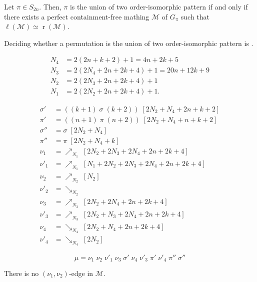 \documentclass[a4paper,10pt]{llncs}
\DeclareMathOperator{\LEFT}{\ell}
\DeclareMathOperator{\RIGHT}{r}
\begin{document}
\begin{proposition}
Let $\pi \in S_{2n}$.
Then,
$\pi$ is the union of two order-isomorphic pattern
if and only if
there exists a perfect containment-free mathing
$\mathcal{M}$ of $G_\pi$ such that
$\LEFT(\mathcal{M}) \simeq \RIGHT(\mathcal{M})$.
\end{proposition}

\begin{proposition}
Deciding whether a permutation is the union of two
order-isomorphic pattern is \NPC.
\end{proposition}


\begin{align*}
N_4 &= 2(2n + k + 2) + 1  = 4n + 2k + 5 \\
N_3 &= 2(2N_4 + 2n + 2k + 4) + 1 = 20n + 12k + 9 \\
N_2 &= 2(2N_3 + 2n + 2k + 4) + 1 \\
N_1 &= 2(2N_2 + 2n + 2k + 4) + 1\text{.}
\end{align*}

\begin{align*}
\sigma'  &= ((k+1) \; \sigma \; (k+2)) \; [2N_2 + N_4 + 2n + k + 2] \\
\pi'     &= ((n+1) \; \pi \; (n+2)) \; [2N_2 + N_4 + n + k + 2] \\
\sigma'' &= \sigma \; [2N_2 + N_4] \\
\pi''    &= \pi \; [2N_2 + N_4 + k] \\
\nu_1    &= \nearrow_{N_1} \; [2N_2 + 2N_3 + 2N_4 + 2n + 2k + 4] \\
\nu'_1   &= \nearrow_{N_1} \; [N_1 + 2N_2 + 2N_3 + 2N_4 + 2n + 2k + 4] \\
\nu_2    &= \nearrow_{N_2} \; [N_2] \\
\nu'_2   &= \searrow_{N_2} \\
\nu_3    &= \nearrow_{N_3} \; [2N_2 + 2N_4 + 2n + 2k + 4] \\
\nu'_3   &= \nearrow_{N_3} \; [2N_2 + N_3 + 2N_4 + 2n + 2k + 4] \\
\nu_4    &= \searrow_{N_4} \; [2N_2 + N_4 + 2n + 2k + 4] \\
\nu'_4   &= \searrow_{N_4} \; [2N_2]
\end{align*}

$$
\mu
=
\nu_1 \; \nu_2 \; \nu'_1 \; \nu_3 \; \sigma' \; \nu_4 \; \nu'_3 \; \pi' \; \nu'_4 \; \pi'' \; \sigma''
$$

\begin{claim}
  \label{claim:no nu_1 - nu_1 edge}
  There is no $(\nu_1, \nu_2)$-edge in $\mathcal{M}$.
\end{claim}
\end{document}
